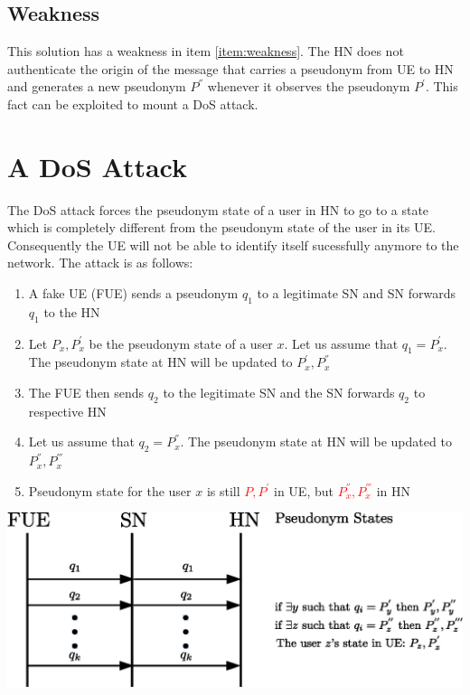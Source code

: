 \documentclass[portrait,a0]{a0poster}
\begin{document}
\begin{multicols}{2}
\subsection*{Weakness}This solution has a weakness in item \ref{item:weakness}. The HN does not authenticate the origin of the message that carries a pseudonym from UE to HN and generates a new pseudonym $P^{''}$ whenever it observes the pseudonym $P^{'}$. This fact can be exploited to mount a DoS attack.

\section{A D\MakeLowercase{o}S Attack}
The DoS attack forces the pseudonym state of a user in HN to go to a state which is completely different from the pseudonym state of the user in its UE. Consequently the UE will not be able to identify itself sucessfully anymore to the network. The attack is as follows:
\begin{enumerate}
\item \label{send_fake_pseudonym} A fake UE (FUE) sends a pseudonym $q_1$ to a legitimate SN and SN forwards $q_1$ to the HN
\item \label{q_equal_pseudonym} Let $P_x,P_x^{'}$ be the pseudonym state of a user $x$. Let us assume that $q_1=P_x^{'}$. The pseudonym state at HN will be updated to $P_x^{'},P_x^{''}$
\item The FUE then sends $q_2$ to the legitimate SN and the SN forwards $q_2$ to respective HN
\item Let us assume that $q_2=P_x^{''}$. The pseudonym state at HN will be updated to $P_x^{''},P_x^{'''}$
\item Pseudonym state for the user $x$ is still \textcolor{red}{$P,P^{'}$} in UE, but \textcolor{red}{$P_x^{''},P_x^{'''}$} in HN
\end{enumerate}

\begin{center}
\begin{minipage}[t]{0.9\linewidth} %
\vspace{.25cm} %
\includegraphics[width=1\linewidth]{attack.eps}
\hspace{0pt}
\vspace{.25cm} %
\end{minipage} 
\end{center}


\end{multicols}
\end{document}

